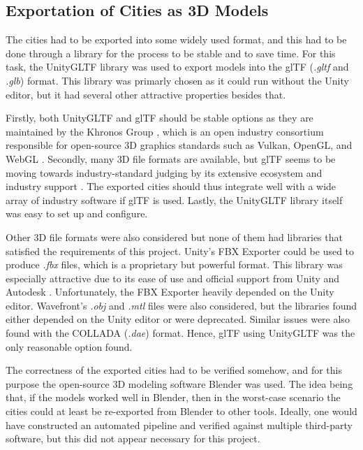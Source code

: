 \subsection{Exportation of Cities as 3D Models}

The cities had to be exported into some widely used format, and this had to be done through a library for the process to be stable and to save time.
For this task, the UnityGLTF \cite{unity_gltf} library was used to export models into the glTF (\textit{.gltf} and \textit{.glb}) \cite{gltf} format.
This library was primarly chosen as it could run without the Unity editor, but it had several other attractive properties besides that.

Firstly, both UnityGLTF and glTF should be stable options as they are maintained by the Khronos Group \cite{unity_gltf} \cite{gltf}, which is an open industry consortium responsible for open-source 3D graphics standards such as Vulkan, OpenGL, and WebGL \cite{khronos_about}.
Secondly, many 3D file formats are available, but glTF seems to be moving towards industry-standard judging by its extensive ecosystem and industry support \cite{gltf}.
The exported cities should thus integrate well with a wide array of industry software if glTF is used.
Lastly, the UnityGLTF library itself was easy to set up and configure.

Other 3D file formats were also considered but none of them had libraries that satisfied the requirements of this project.
Unity's FBX Exporter \cite{fbxexporter} could be used to produce \textit{.fbx} \cite{fbx} files, which is a proprietary but powerful format.
This library was especially attractive due to its ease of use and official support from Unity and Autodesk \cite{fbxexporter}.
Unfortunately, the FBX Exporter heavily depended on the Unity editor.
Wavefront's \textit{.obj} \cite{obj_files} and \textit{.mtl} \cite{mtl_files} files were also considered, but the libraries found either depended on the Unity editor or were deprecated.
Similar issues were also found with the COLLADA (\textit{.dae}) \cite{collada_files} format.
Hence, glTF using UnityGLTF was the only reasonable option found.

The correctness of the exported cities had to be verified somehow, and for this purpose the open-source 3D modeling software Blender \cite{blender} was used. 
The idea being that, if the models worked well in Blender, then in the worst-case scenario the cities could at least be re-exported from Blender to other tools.
Ideally, one would have constructed an automated pipeline and verified against multiple third-party software, but this did not appear necessary for this project.